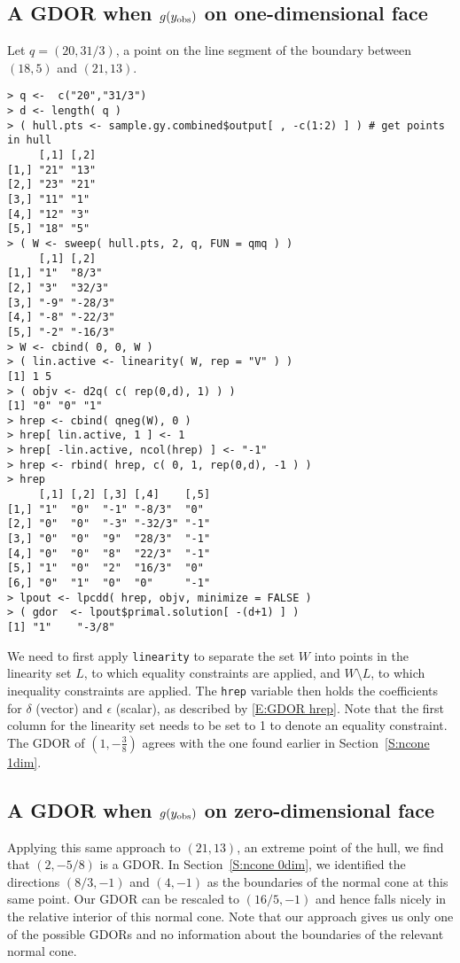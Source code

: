 \subsection{A GDOR when $g(y_{\text{obs}})$ on one-dimensional face} \label{S:GDOR 1dim}
Let $q = (20, 31/3)$, a point on the line segment of the boundary
between $(18,5)$ and $(21,13)$.
{\singlespace
\begin{verbatim}
> q <-  c("20","31/3")
> d <- length( q )
> ( hull.pts <- sample.gy.combined$output[ , -c(1:2) ] ) # get points in hull
     [,1] [,2]
[1,] "21" "13"
[2,] "23" "21"
[3,] "11" "1" 
[4,] "12" "3" 
[5,] "18" "5" 
> ( W <- sweep( hull.pts, 2, q, FUN = qmq ) )
     [,1] [,2]   
[1,] "1"  "8/3"  
[2,] "3"  "32/3" 
[3,] "-9" "-28/3"
[4,] "-8" "-22/3"
[5,] "-2" "-16/3"
> W <- cbind( 0, 0, W )
> ( lin.active <- linearity( W, rep = "V" ) )
[1] 1 5
> ( objv <- d2q( c( rep(0,d), 1) ) )
[1] "0" "0" "1"
> hrep <- cbind( qneg(W), 0 ) 
> hrep[ lin.active, 1 ] <- 1
> hrep[ -lin.active, ncol(hrep) ] <- "-1"
> hrep <- rbind( hrep, c( 0, 1, rep(0,d), -1 ) )
> hrep
     [,1] [,2] [,3] [,4]    [,5]
[1,] "1"  "0"  "-1" "-8/3"  "0" 
[2,] "0"  "0"  "-3" "-32/3" "-1"
[3,] "0"  "0"  "9"  "28/3"  "-1"
[4,] "0"  "0"  "8"  "22/3"  "-1"
[5,] "1"  "0"  "2"  "16/3"  "0" 
[6,] "0"  "1"  "0"  "0"     "-1"
> lpout <- lpcdd( hrep, objv, minimize = FALSE )
> ( gdor  <- lpout$primal.solution[ -(d+1) ] )
[1] "1"    "-3/8"
\end{verbatim}
}
We need to first apply \texttt{linearity} to separate the set $W$ into points in the 
linearity set $L$, to which equality constraints are applied, and 
$W \setminus L$, to which inequality constraints are applied.  
The \texttt{hrep} variable then holds the coefficients for $\delta$ (vector) and
$\epsilon$ (scalar), as described by \eqref{E:GDOR hrep}.  Note that the first column
for the linearity set needs to be set to 1 to denote an equality constraint.
The GDOR of $(1, -\frac{3}{8} )$ agrees with the one found earlier
in Section~\ref{S:ncone 1dim}.

\subsection{A GDOR when $g(y_{\text{obs}})$ on zero-dimensional face} \label{S:GDOR 0dim}
Applying this same approach to $(21,13)$, an extreme point of the hull, 
we find that  $(2, -5/8)$ is a GDOR.
In Section~\ref{S:ncone 0dim}, we identified the directions $(8/3, -1)$ and $(4,-1)$ 
as the boundaries of the normal cone at this same point.  
Our GDOR can be rescaled to $(16/5,-1)$ and hence falls
nicely in the relative interior of this normal cone.  Note that our approach gives us 
only one of the possible GDORs and no information about the boundaries of the relevant
normal cone.

